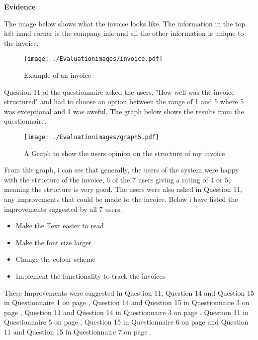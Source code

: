 \textbf{Evidence} \newline

The image below shows what the invoice looks like. The information in the top left hand corner is the company info and all the other information is unique to the invoice.

\begin{figure}[H]
\caption{Example of an invoice} \label{invoice}
\hfill\texttt{[image: ./Evaluationimages/invoice.pdf]}
\end{figure}

\pagebreak

Question 11 of the questionnaire asked the users, "How well was the invoice structured" and had to choose an option between the range of 1 and 5 where 5 was exceptional and 1 was aweful. The graph below shows the results from the questionnaire.

 \begin{figure}[H]
\caption{A Graph to show the users opinion on the structure of my invoice} \label{graph5}
\hfill\texttt{[image: ./Evaluationimages/graph5.pdf]}
\end{figure}

From this graph, i can see that generally, the users of the system were happy with the structure of the invoice, 6 of the 7 users giving a rating of 4 or 5, meaning the structure is very good. The users were also asked in Question 11, any improvements that could be made to the invoice. Below i have listed the improvements suggested by all 7 users.

\begin{itemize}
	\item{ Make the Text easier to read}
	\item{ Make the font size larger}
	\item{ Change the colour scheme}
	\item{Implement the functionality to track the invoices}
\end{itemize}

These Improvements were suggested in Question 11, Question 14 and Question 15 in Questionnaire 1 on page \pageref{Client-Q1}, Question 14 and Question 15 in Questionnaire 3 on page \pageref{Questionnaire3}, Question 11 and Question 14 in Questionnaire 3 on page \pageref{Questionnaire3}. Question 11  in Questionnaire 5 on page \pageref{Questionnaire5}, Question 15  in Questionnaire 6 on page \pageref{Questionnaire6} and Question 11 and Question 15 in Questionnaire 7 on page \pageref{Questionnaire7}.


